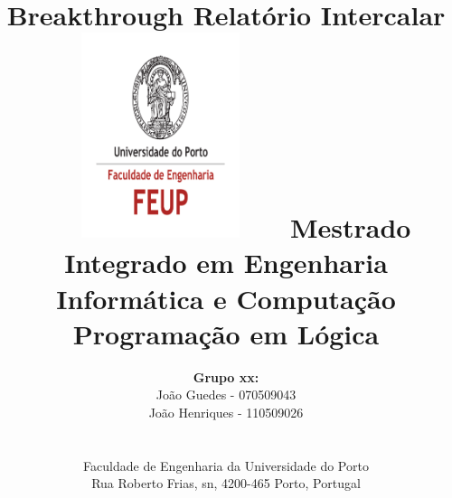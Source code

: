 \documentclass[15pt,a4paper]{article}
\begin{document}
\setlength{\textwidth}{16cm}
\setlength{\textheight}{22cm}

\title{\Huge\textbf{Breakthrough}\linebreak\linebreak\linebreak
\Large\textbf{Relatório Intercalar}\linebreak\linebreak
\includegraphics[height=6cm, width=7cm]{feup.pdf}\linebreak \linebreak
\Large{Mestrado Integrado em Engenharia Informática e Computação} \linebreak \linebreak
\Large{Programação em Lógica}\linebreak
}

\author{\textbf{Grupo xx:}\\ João Guedes - 070509043 \\ João Henriques - 110509026 \\\linebreak\linebreak \\
 \\ Faculdade de Engenharia da Universidade do Porto \\ Rua Roberto Frias, s\/n, 4200-465 Porto, Portugal \linebreak\linebreak\linebreak
\linebreak\linebreak\vspace{1cm}}
\maketitle
\thispagestyle{empty}

\end{document}
